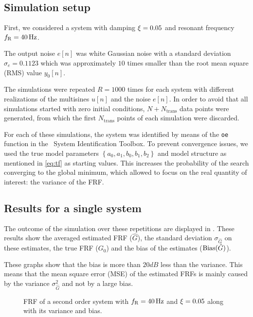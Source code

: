\subsection{Simulation setup}
First, we considered a system with damping $\xi=0.05$ and resonant
frequency $f_{\mathrm{R}} = 40 \,\mathrm{Hz}$.

The output noise $e[n]$ was white Gaussian noise with a standard deviation
$\sigma_e = 0.1123$ which was approximately $10$ times smaller than the
root mean square (RMS) value $y_0[n]$.

The simulations were repeated $R=1000$ times for each system with different realizations of the multisines $u[n]$ and the noise $e[n]$.
In order to avoid that all simulations started with zero initial conditions, $N + N_{\mathrm{trans}}$ data points were generated, from which the first $N_{\mathrm{trans}}$ points of each simulation were discarded. 

For each of these simulations, the system was identified by means of the \texttt{oe}
function in the \matlab\ System Identification Toolbox\Cite{TDIDENT}.
To prevent convergence issues, we used the true model parameters
$\left\{ a_0, a_1, b_0, b_1, b_2 \right\}$ and model structure
as mentioned in \eqref{eq:tf} as starting values.
This increases the probability of the search converging to the global minimum, which
allowed to focus on the real quantity of interest: the variance of the FRF.

\subsection{Results for a single system}
The outcome of the simulation over these repetitions are displayed in .
These results show the averaged estimated FRF ($\hat{G}$), the standard deviation  $\sigma_{\hat{G}}$ on these estimates, the true FRF ($G_0$) and the bias of the estimates ($\operatorname{Bias} (\hat{G})$).

These graphs show that the bias is more than $20 \unit{dB}$ less than the variance.
This means that the mean square error (MSE) of the estimated FRFs is mainly caused by the variance $\sigma_{\hat{G}}^2$ and not by a large bias.

\begin{figure}[hpt]
  \centering
  \setlength{\figurewidth}{0.8\columnwidth}
  \setlength{\figureheight}{5cm}
  
  \caption{FRF of a second order system with $f_{\mathrm{R}}=40\,\mathrm{Hz}$ and $\xi=0.05$ 
           along with its variance and bias.}%
  \label{fig:FRF1}
\end{figure}

